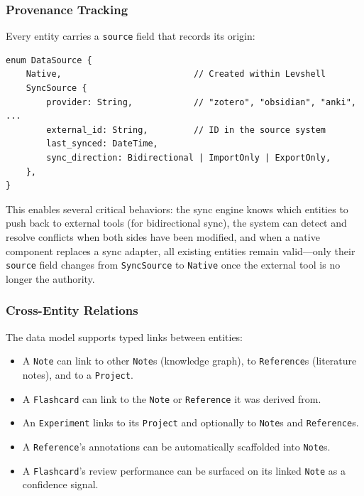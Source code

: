 \documentclass[11pt,a4paper]{article}
\begin{document}
\subsubsection{Provenance Tracking}

Every entity carries a \texttt{source} field that records its origin:

\begin{lstlisting}[language={}]
enum DataSource {
    Native,                          // Created within Levshell
    SyncSource {
        provider: String,            // "zotero", "obsidian", "anki", ...
        external_id: String,         // ID in the source system
        last_synced: DateTime,
        sync_direction: Bidirectional | ImportOnly | ExportOnly,
    },
}
\end{lstlisting}

This enables several critical behaviors: the sync engine knows which entities to push back to external tools (for bidirectional sync), the system can detect and resolve conflicts when both sides have been modified, and when a native component replaces a sync adapter, all existing entities remain valid---only their \texttt{source} field changes from \texttt{SyncSource} to \texttt{Native} once the external tool is no longer the authority.

\subsubsection{Cross-Entity Relations}

The data model supports typed links between entities:

\begin{itemize}[leftmargin=1.5em, itemsep=2pt]
  \item A \texttt{Note} can link to other \texttt{Note}s (knowledge graph), to \texttt{Reference}s (literature notes), and to a \texttt{Project}.
  \item A \texttt{Flashcard} can link to the \texttt{Note} or \texttt{Reference} it was derived from.
  \item An \texttt{Experiment} links to its \texttt{Project} and optionally to \texttt{Note}s and \texttt{Reference}s.
  \item A \texttt{Reference}'s annotations can be automatically scaffolded into \texttt{Note}s.
  \item A \texttt{Flashcard}'s review performance can be surfaced on its linked \texttt{Note} as a confidence signal.
\end{itemize}
\end{document}
